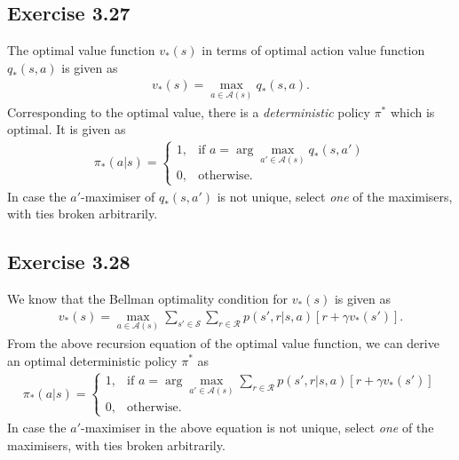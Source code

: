 \documentclass[10pt]{article}
\begin{document}
	 \subsection*{Exercise 3.27}
	 \label{ss:3.27}
	 The optimal value function $v_*(s)$ in terms of optimal action value function $q_*(s,a)$ is given as
	 \begin{align*}
	 v_*(s) = \max\limits_{a\in\mathcal{A}(s)} q_*(s,a).
	 \end{align*}
	 Corresponding to the optimal value, there is a \emph{deterministic} policy $\pi^*$ which is optimal. It is given as
	 \begin{align*}
	 \pi_*(a|s) = 
	 \begin{cases}
	 1,& \text{if } a = \displaystyle\arg\max_{a'\in\mathcal{A}(s)} q_{*}(s,a')\\
	 0,& \text{otherwise.}
	 \end{cases}
	 \end{align*}
	 In case the $a'$-maximiser of $q_*(s,a')$ is not unique, select \emph{one} of the maximisers, with ties broken arbitrarily.
	 \subsection*{Exercise 3.28}
	 \label{ss:3.28}
	 We know that the Bellman optimality condition for $v_*(s)$ is given as
	 \begin{align*}
	 v_*(s) = \max\limits_{a\in\mathcal{A}(s)} \sum_{s'\in\mathcal{S}} \sum_{r\in\mathcal{R}} p(s',r|s,a)\left[ r + \gamma v_*(s') \right].
	 \end{align*}
	 From the above recursion equation of the optimal value function, we can derive an optimal deterministic policy $\pi^*$ as
	 \begin{align*}
	 \pi_*(a|s) = 
	 \begin{cases}
	 1,& \text{if } a = \displaystyle\arg\max_{a'\in\mathcal{A}(s)} \sum_{r\in\mathcal{R}} p(s',r|s,a)\left[ r + \gamma v_*(s') \right]\\
	 0,& \text{otherwise.}
	 \end{cases}
	 \end{align*}
	 In case the $a'$-maximiser in the above equation is not unique, select \emph{one} of the maximisers, with ties broken arbitrarily.
\end{document}
